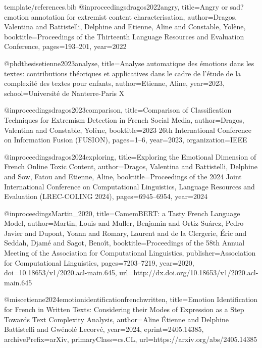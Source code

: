 \begin{filecontents*}{template/references.bib}
@inproceedings{dragos2022angry,
  title={Angry or sad? emotion annotation for extremist content characterisation},
  author={Dragos, Valentina and Battistelli, Delphine and Etienne, Aline and Constable, Yol{\`e}ne},
  booktitle={Proceedings of the Thirteenth Language Resources and Evaluation Conference},
  pages={193--201},
  year={2022}
}

@phdthesis{etienne2023analyse,
  title={Analyse automatique des {\'e}motions dans les textes: contributions th{\'e}oriques et applicatives dans le cadre de l'{\'e}tude de la complexit{\'e} des textes pour enfants},
  author={Etienne, Aline},
  year={2023},
  school={Universit{\'e} de Nanterre-Paris X}
}

@inproceedings{dragos2023comparison,
  title={Comparison of Classification Techniques for Extremism Detection in French Social Media},
  author={Dragos, Valentina and Constable, Yol{\`e}ne},
  booktitle={2023 26th International Conference on Information Fusion (FUSION)},
  pages={1--6},
  year={2023},
  organization={IEEE}
}

@inproceedings{dragos2024exploring,
  title={Exploring the Emotional Dimension of French Online Toxic Content},
  author={Dragos, Valentina and Battistelli, Delphine and Sow, Fatou and Etienne, Aline},
  booktitle={Proceedings of the 2024 Joint International Conference on Computational Linguistics, Language Resources and Evaluation (LREC-COLING 2024)},
  pages={6945--6954},
  year={2024}
}

@inproceedings{Martin_2020,
  title={{CamemBERT}: a Tasty French Language Model},
  author={Martin, Louis and Muller, Benjamin and Ortiz Su{\'a}rez, Pedro Javier and Dupont, Yoann and Romary, Laurent and de la Clergerie, {\'E}ric and Seddah, Djam{\'e} and Sagot, Beno{\^i}t},
  booktitle={Proceedings of the 58th Annual Meeting of the Association for Computational Linguistics},
  publisher={Association for Computational Linguistics},
  pages={7203--7219},
  year={2020},
  doi={10.18653/v1/2020.acl-main.645},
  url={http://dx.doi.org/10.18653/v1/2020.acl-main.645}
}

@misc{etienne2024emotionidentificationfrenchwritten,
  title={Emotion Identification for French in Written Texts: Considering their Modes of Expression as a Step Towards Text Complexity Analysis},
  author={Aline {\'E}tienne and Delphine Battistelli and Gw{\'e}nol{\'e} Lecorv{\'e}},
  year={2024},
  eprint={2405.14385},
  archivePrefix={arXiv},
  primaryClass={cs.CL},
  url={https://arxiv.org/abs/2405.14385}
}


\end{filecontents*}
